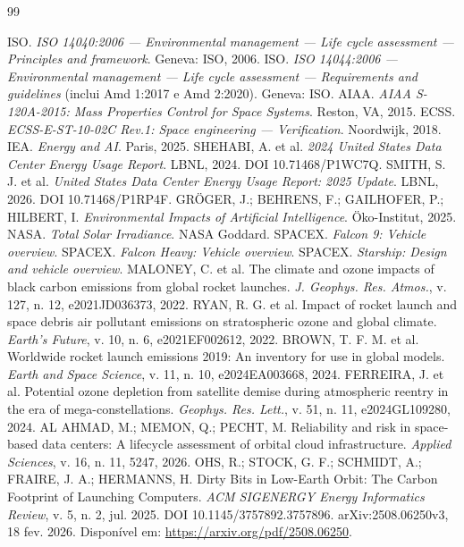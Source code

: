 \documentclass[11pt,a4paper]{article}
\begin{document}
\begin{thebibliography}{99}
\small

 ISO. \emph{ISO 14040:2006 --- Environmental management --- Life cycle assessment --- Principles and framework}. Geneva: ISO, 2006.
 ISO. \emph{ISO 14044:2006 --- Environmental management --- Life cycle assessment --- Requirements and guidelines} (inclui Amd 1:2017 e Amd 2:2020). Geneva: ISO.
 AIAA. \emph{AIAA S-120A-2015: Mass Properties Control for Space Systems}. Reston, VA, 2015.
 ECSS. \emph{ECSS-E-ST-10-02C Rev.1: Space engineering --- Verification}. Noordwijk, 2018.
 IEA. \emph{Energy and AI}. Paris, 2025.
 SHEHABI, A. et al. \emph{2024 United States Data Center Energy Usage Report}. LBNL, 2024. DOI 10.71468/P1WC7Q.
 SMITH, S. J. et al. \emph{United States Data Center Energy Usage Report: 2025 Update}. LBNL, 2026. DOI 10.71468/P1RP4F.
 GRÖGER, J.; BEHRENS, F.; GAILHOFER, P.; HILBERT, I. \emph{Environmental Impacts of Artificial Intelligence}. Öko-Institut, 2025.
 NASA. \emph{Total Solar Irradiance}. NASA Goddard.
 SPACEX. \emph{Falcon 9: Vehicle overview}.
 SPACEX. \emph{Falcon Heavy: Vehicle overview}.
 SPACEX. \emph{Starship: Design and vehicle overview}.
 MALONEY, C. et al. The climate and ozone impacts of black carbon emissions from global rocket launches. \emph{J. Geophys. Res. Atmos.}, v. 127, n. 12, e2021JD036373, 2022.
 RYAN, R. G. et al. Impact of rocket launch and space debris air pollutant emissions on stratospheric ozone and global climate. \emph{Earth's Future}, v. 10, n. 6, e2021EF002612, 2022.
 BROWN, T. F. M. et al. Worldwide rocket launch emissions 2019: An inventory for use in global models. \emph{Earth and Space Science}, v. 11, n. 10, e2024EA003668, 2024.
 FERREIRA, J. et al. Potential ozone depletion from satellite demise during atmospheric reentry in the era of mega-constellations. \emph{Geophys. Res. Lett.}, v. 51, n. 11, e2024GL109280, 2024.
 AL AHMAD, M.; MEMON, Q.; PECHT, M. Reliability and risk in space-based data centers: A lifecycle assessment of orbital cloud infrastructure. \emph{Applied Sciences}, v. 16, n. 11, 5247, 2026.
 OHS, R.; STOCK, G. F.; SCHMIDT, A.; FRAIRE, J. A.; HERMANNS, H. Dirty Bits in Low-Earth Orbit: The Carbon Footprint of Launching Computers. \emph{ACM SIGENERGY Energy Informatics Review}, v. 5, n. 2, jul. 2025. DOI 10.1145/3757892.3757896. arXiv:2508.06250v3, 18 fev. 2026. Disponível em: \url{https://arxiv.org/pdf/2508.06250}.

\end{thebibliography}
\end{document}
